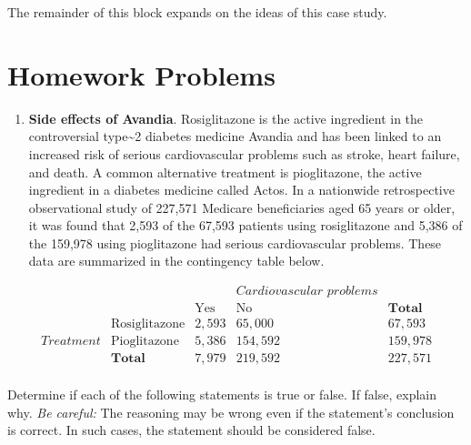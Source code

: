 \documentclass[
  letterpaper,
  DIV=11,
  numbers=noendperiod]{scrreprt}
\providecommand{\tightlist}{%
  \setlength{\itemsep}{0pt}\setlength{\parskip}{0pt}}\usepackage{longtable,booktabs,array}
\begin{document}
The remainder of this block expands on the ideas of this case study.

\section{Homework Problems}\label{homework-problems-17}

\begin{enumerate}
\def\labelenumi{\arabic{enumi}.}
\tightlist
\item
  \textbf{Side effects of Avandia}. Rosiglitazone is the active
  ingredient in the controversial type\textasciitilde2 diabetes medicine
  Avandia and has been linked to an increased risk of serious
  cardiovascular problems such as stroke, heart failure, and death. A
  common alternative treatment is pioglitazone, the active ingredient in
  a diabetes medicine called Actos. In a nationwide retrospective
  observational study of 227,571 Medicare beneficiaries aged 65 years or
  older, it was found that 2,593 of the 67,593 patients using
  rosiglitazone and 5,386 of the 159,978 using pioglitazone had serious
  cardiovascular problems. These data are summarized in the contingency
  table below.
\end{enumerate}

\[
\begin{array}{cc|ccc} & & &\textit{Cardiovascular problems}\\ 
& & \text{Yes}  & \text{No} & \textbf{Total}  \\
& \hline \text{Rosiglitazone}   & 2,593 & 65,000        & 67,593 \\
\textit{Treatment}& \text{Pioglitazone}     & 5,386     & 154,592   & 159,978  \\
& \textbf{Total}            & 7,979 & 219,592       & 227,571 \\
\end{array} 
\]

Determine if each of the following statements is true or false. If
false, explain why. \textit{Be careful:} The reasoning may be wrong even
if the statement's conclusion is correct. In such cases, the statement
should be considered false.
\end{document}
